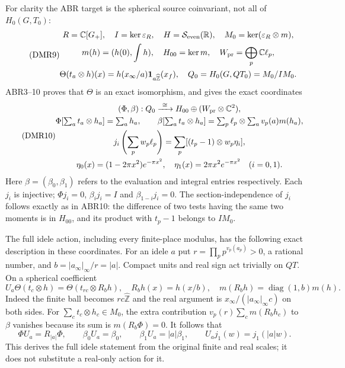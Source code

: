 For clarity the ABR target is the spherical source coinvariant,
not all of $H_0(G,T_0)$:
\begin{equation}\tag{DMR9}
\begin{gathered}
R=\mathbb C[G_+],\quad I=\ker\varepsilon_R,
\quad H=\mathcal S_{\rm even}(\mathbb R),
\quad M_0=\ker(\varepsilon_R\otimes m),\\
m(h)=(h(0),\int h),\quad H_{00}=\ker m,\quad
W_{\rm pr}=\bigoplus_p\mathbb C\ell_p,\\
\Theta(t_a\otimes h)(x)=h(x_\infty/a)
                          \mathbf1_{a\widehat{\mathbb Z}}(x_f),
\quad Q_0=H_0(G,QT_0)=M_0/IM_0.
\end{gathered}
\end{equation}
ABR3--10 proves that $\Theta$ is an exact isomorphism, and gives
the exact coordinates
\begin{equation}\tag{DMR10}
\begin{gathered}
(\Phi,\beta):Q_0\xrightarrow{\ \cong\ }
        H_{00}\oplus(W_{\rm pr}\otimes\mathbb C^2),\\
\Phi[\textstyle\sum_a t_a\otimes h_a]=\sum_a h_a,\qquad
\beta[\textstyle\sum_a t_a\otimes h_a]
 =\sum_p\ell_p\otimes\sum_a v_p(a)m(h_a),\\
j_i\left(\sum_p w_p\ell_p\right)
 =\sum_p[(t_p-1)\otimes w_p\eta_i],\\
\eta_0(x)=(1-2\pi x^2)e^{-\pi x^2},\quad
\eta_1(x)=2\pi x^2e^{-\pi x^2}\quad(i=0,1).
\end{gathered}
\end{equation}
Here $\beta=(\beta_0,\beta_1)$ refers to the evaluation and
integral entries respectively. Each $j_i$ is injective;
$\Phi j_i=0$, $\beta_i j_i=I$ and $\beta_{1-i}j_i=0$.
The section-independence of $j_i$ follows exactly as in ABR10:
the difference of two tests having the same two moments is in
$H_{00}$, and its product with $t_p-1$ belongs to $IM_0$.

The full idele action, including every finite-place modulus, has
the following exact description in these coordinates. For an idele
$a$ put $r=\prod_p p^{v_p(a_p)}>0$, a rational number, and
$b=|a_\infty|_\infty/r=|a|$. Compact units and real sign act
trivially on $QT$. On a spherical coefficient
\begin{equation}\tag{DMR11}
U_a\Theta(t_c\otimes h)=\Theta(t_{rc}\otimes R_bh),
\quad R_bh(x)=h(x/b),\quad
m(R_bh)=\operatorname{diag}(1,b)m(h).
\end{equation}
Indeed the finite ball becomes $rc\widehat{\mathbb Z}$ and the
real argument is $x_\infty/(|a_\infty|_\infty c)$ on both
sides. For $\sum_ct_c\otimes h_c\in M_0$, the extra contribution
$v_p(r)\sum_cm(R_bh_c)$ to $\beta$ vanishes because its sum
is $m(R_b\Phi)=0$. It follows that
\begin{equation}\tag{DMR12}
\Phi U_a=R_{|a|}\Phi,\qquad
\beta_0U_a=\beta_0,\qquad \beta_1U_a=|a|\beta_1,
\qquad U_aj_1(w)=j_1(|a|w).
\end{equation}
This derives the full idele statement from the original finite
and real scales; it does not substitute a real-only action for it.

